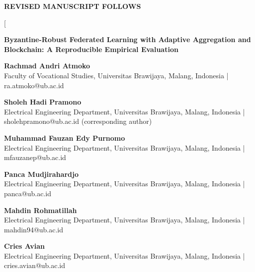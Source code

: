 \documentclass[10pt,letterpaper]{article}
\begin{document}
\begin{center}
\textbf{REVISED MANUSCRIPT FOLLOWS}
\end{center}

\newpage
\twocolumn[
\begin{minipage}{\textwidth}
\raggedright
{\Large\bfseries Byzantine-Robust Federated Learning with Adaptive Aggregation
and Blockchain: A Reproducible Empirical Evaluation\par}
\vspace{0.5em}
\textbf{Rachmad Andri Atmoko}\\
Faculty of Vocational Studies, Universitas Brawijaya, Malang, Indonesia |
ra.atmoko@ub.ac.id\par
\textbf{Sholeh Hadi Pramono}\\
Electrical Engineering Department, Universitas Brawijaya, Malang, Indonesia |
sholehpramono@ub.ac.id (corresponding author)\par
\textbf{Muhammad Fauzan Edy Purnomo}\\
Electrical Engineering Department, Universitas Brawijaya, Malang, Indonesia |
mfauzanep@ub.ac.id\par
\textbf{Panca Mudjirahardjo}\\
Electrical Engineering Department, Universitas Brawijaya, Malang, Indonesia |
panca@ub.ac.id\par
\textbf{Mahdin Rohmatillah}\\
Electrical Engineering Department, Universitas Brawijaya, Malang, Indonesia |
mahdin94@ub.ac.id\par
\textbf{Cries Avian}\\
Electrical Engineering Department, Universitas Brawijaya, Malang, Indonesia |
cries.avian@ub.ac.id
\end{minipage}
\end{document}
